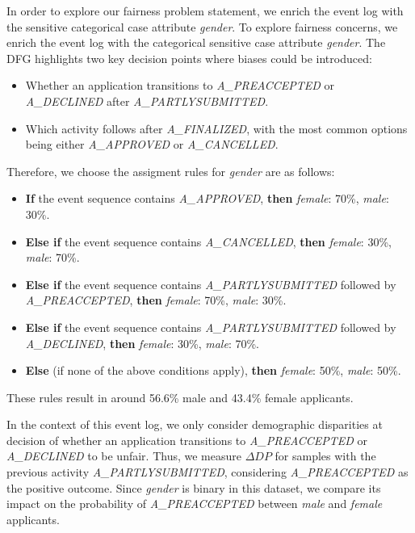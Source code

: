 In order to explore our fairness problem statement, we enrich the event log with the sensitive categorical case attribute \textit{gender}.
To explore fairness concerns, we enrich the event log with the categorical sensitive case attribute \textit{gender}.
The DFG highlights two key decision points where biases could be introduced:
\begin{itemize}
\item Whether an application transitions to \textit{A\_PREACCEPTED} or \textit{A\_DECLINED} after \textit{A\_PARTLYSUBMITTED}.
\item Which activity follows after \textit{A\_FINALIZED},
with the most common options being either \textit{A\_APPROVED} or \textit{A\_CANCELLED}.
\end{itemize}
Therefore, we choose the assigment rules for \textit{gender} are as follows:
\begin{itemize}  
    \setlength{\itemsep}{0pt}
    \item \textbf{If} the event sequence contains \textit{A\_APPROVED},
        \textbf{then} \textit{female}: 70\%, \textit{male}: 30\%.  
    \item \textbf{Else if} the event sequence contains \textit{A\_CANCELLED},
        \textbf{then} \textit{female}: 30\%, \textit{male}: 70\%.  
    \item \textbf{Else if} the event sequence contains \textit{A\_PARTLYSUBMITTED} followed by \textit{A\_PRE\-ACCEPTED},
        \textbf{then} \textit{female}: 70\%, \textit{male}: 30\%.  
    \item \textbf{Else if} the event sequence contains \textit{A\_PARTLYSUBMITTED} followed by \textit{A\_DE\-CLINED},
        \textbf{then} \textit{female}: 30\%, \textit{male}: 70\%.  
    \item \textbf{Else} (if none of the above conditions apply),
        \textbf{then} \textit{female}: 50\%, \textit{male}: 50\%.  
\end{itemize}  
These rules result in around 56.6\% male and 43.4\% female applicants.

In the context of this event log, we only consider demographic disparities at decision of whether an application transitions to
\textit{A\_PREACCEPTED} or \textit{A\_DECLINED} to be unfair.
Thus, we measure $\Delta \textit{DP}$ for samples with the previous activity \textit{A\_PARTLYSUBMITTED},
considering \textit{A\_PREACCEPTED} as the positive outcome.
Since \textit{gender} is binary in this dataset,
we compare its impact on the probability of \textit{A\_PREACCEPTED} between \textit{male} and \textit{female} applicants.

